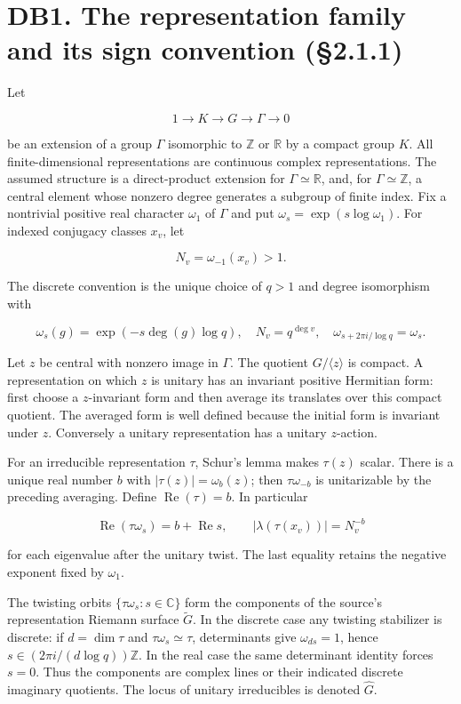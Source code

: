\documentclass[
]{report}
\begin{document}
\section{DB1. The representation family and its sign convention
(§2.1.1)}\label{db1.-the-representation-family-and-its-sign-convention-2.1.1}

Let

\[
 1\longrightarrow K\longrightarrow G\longrightarrow\Gamma\longrightarrow0
 \tag{DB1.1}
\]

be an extension of a group \(\Gamma\) isomorphic to \(\mathbb Z\) or
\(\mathbb R\) by a compact group \(K\). All finite-dimensional
representations are continuous complex representations. The assumed
structure is a direct-product extension for \(\Gamma\simeq\mathbb R\),
and, for \(\Gamma\simeq\mathbb Z\), a central element whose nonzero
degree generates a subgroup of finite index. Fix a nontrivial positive
real character \(\omega_1\) of \(\Gamma\) and put
\(\omega_s=\exp(s\log\omega_1)\). For indexed conjugacy classes \(x_v\),
let

\[
 N_v=\omega_{-1}(x_v)>1.
 \tag{DB1.2}
\]

The discrete convention is the unique choice of \(q>1\) and degree
isomorphism with

\[
 \omega_s(g)=\exp(-s\deg(g)\log q),\quad
 N_v=q^{\deg v},\quad
 \omega_{s+2\pi i/\log q}=\omega_s.
 \tag{DB1.3}
\]

Let \(z\) be central with nonzero image in \(\Gamma\). The quotient
\(G/\langle z\rangle\) is compact. A representation on which \(z\) is
unitary has an invariant positive Hermitian form: first choose a
\(z\)-invariant form and then average its translates over this compact
quotient. The averaged form is well defined because the initial form is
invariant under \(z\). Conversely a unitary representation has a unitary
\(z\)-action.

For an irreducible representation \(\tau\), Schur's lemma makes
\(\tau(z)\) scalar. There is a unique real number \(b\) with
\(|\tau(z)|=\omega_b(z)\); then \(\tau\omega_{-b}\) is unitarizable by
the preceding averaging. Define \(\operatorname{Re}(\tau)=b\). In
particular

\[
 \operatorname{Re}(\tau\omega_s)=b+\operatorname{Re}s,
 \qquad
 |\lambda(\tau(x_v))|=N_v^{-b}
 \tag{DB1.4}
\]

for each eigenvalue after the unitary twist. The last equality retains
the negative exponent fixed by \(\omega_1\).

The twisting orbits \(\{\tau\omega_s:s\in\mathbb C\}\) form the
components of the source's representation Riemann surface
\(\widetilde G\). In the discrete case any twisting stabilizer is
discrete: if \(d=\dim\tau\) and \(\tau\omega_s\simeq\tau\), determinants
give \(\omega_{ds}=1\), hence \(s\in(2\pi i/(d\log q))\mathbb Z\). In
the real case the same determinant identity forces \(s=0\). Thus the
components are complex lines or their indicated discrete imaginary
quotients. The locus of unitary irreducibles is denoted \(\widehat G\).
\end{document}
